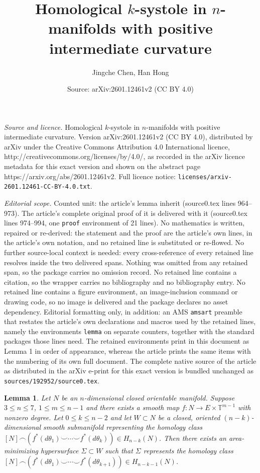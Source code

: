 \documentclass[10pt,a4paper]{amsart}
\title{Homological $k$-systole in $n$-manifolds with positive intermediate curvature}
\author{Jingche Chen, Han Hong}
\date{Source: arXiv:2601.12461v2 (CC BY 4.0)}
\newtheorem{lemma}{Lemma}
\begin{document}
\maketitle

\noindent\emph{Source and licence.} Homological $k$-systole in $n$-manifolds with positive intermediate curvature. Version arXiv:2601.12461v2 (CC BY 4.0), distributed by arXiv under the Creative Commons Attribution 4.0 International licence, http://creativecommons.org/licenses/by/4.0/, as recorded in the arXiv licence metadata for this exact version and shown on the abstract page https://arxiv.org/abs/2601.12461v2. Full licence notice: \texttt{licenses/arxiv-2601.12461-CC-BY-4.0.txt}.\par\smallskip

\noindent\textit{Editorial scope.} Counted unit: the article's lemma inherit (source0.tex lines 964--973). The article's complete original proof of it is delivered with it (source0.tex lines 974--994, one \texttt{proof} environment of 21 lines). No mathematics is written, repaired or re-derived: the statement and the proof are the article's own lines, in the article's own notation, and no retained line is substituted or re-flowed.  No further source-local context is needed: every cross-reference of every retained line resolves inside the two delivered spans.  Nothing was omitted from any retained span, so the package carries no omission record.  No retained line contains a citation, so the wrapper carries no bibliography and no bibliography entry.  No retained line contains a figure environment, an image-inclusion command or drawing code, so no image is delivered and the package declares no asset dependency.  Editorial formatting only, in addition: an AMS \texttt{amsart} preamble that restates the article's own declarations and macros used by the retained lines, namely the environments \texttt{lemma} on separate counters, together with the standard packages those lines need.  The retained environments print in this document as Lemma 1 in order of appearance, whereas the article prints the same items with the numbering of its own full document.  The complete native source of the article as distributed in the arXiv e-print for this exact version is bundled unchanged as \texttt{sources/192952/source0.tex}.
\begin{lemma}\label{topology inherit}
    Let $N$ be an $n$-dimensional closed orientable manifold. Suppose $3\leq n\leq 7$, $1\leq m\leq n-1$ and there exists a smooth map $f:N\rightarrow E\times
      \mathbb{T}^{m-1}$ with nonzero degree. 
      Let $0\leq k\leq n-2$ and let $W\subset N$ be a closed, oriented
      $(n-k)$-dimensional smooth submanifold representing the homology class
      $[N]\frown(f^{*}(d\theta_{1})\smile \cdots\smile f^{*}(d\theta_{k}))\in
      H_{n-k}(N)$. Then there exists an area-minimizing hypersurface
      $\Sigma\subset W$ such that $\Sigma$ represents the homology class
      $[N]\frown(f^{*}(d\theta_{1})\smile \cdots\smile f^{*}(d\theta_{k+1}))\in H_{n-k-1}(N)$.
\end{lemma}
\end{document}
